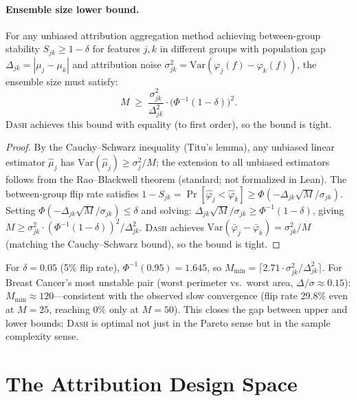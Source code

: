 \documentclass{jmlr}
\newcommand{\Var}{\mathrm{Var}}
\newcommand{\DASH}{\textsc{Dash}}
\begin{document}
\paragraph{Ensemble size lower bound.}
\begin{proposition}
\label{prop:ensemble-lower-bound}
For any unbiased attribution aggregation method achieving between-group stability $S_{jk} \geq 1 - \delta$ for features $j, k$ in different groups with population gap $\Delta_{jk} = |\mu_j - \mu_k|$ and attribution noise $\sigma_{jk}^2 = \Var(\varphi_j(f) - \varphi_k(f))$, the ensemble size must satisfy:
\[
    M \;\geq\; \frac{\sigma_{jk}^2}{\Delta_{jk}^2} \cdot \bigl(\Phi^{-1}(1-\delta)\bigr)^2.
\]
\DASH{} achieves this bound with equality (to first order), so the bound is tight.
\end{proposition}

\begin{proof}
By the Cauchy--Schwarz inequality (Titu's lemma), any unbiased linear estimator $\hat\mu_j$ has $\Var(\hat\mu_j) \geq \sigma_j^2/M$; the extension to all unbiased estimators follows from the Rao--Blackwell theorem (standard; not formalized in Lean). The between-group flip rate satisfies $1 - S_{jk} = \Pr[\hat\varphi_j < \hat\varphi_k] \geq \Phi(-\Delta_{jk}\sqrt{M}/\sigma_{jk})$. Setting $\Phi(-\Delta_{jk}\sqrt{M}/\sigma_{jk}) \leq \delta$ and solving: $\Delta_{jk}\sqrt{M}/\sigma_{jk} \geq \Phi^{-1}(1-\delta)$, giving $M \geq \sigma_{jk}^2 \cdot (\Phi^{-1}(1-\delta))^2/\Delta_{jk}^2$. \DASH{} achieves $\Var(\bar\varphi_j - \bar\varphi_k) = \sigma_{jk}^2/M$ (matching the Cauchy--Schwarz bound), so the bound is tight.
\end{proof}

For $\delta = 0.05$ (5\% flip rate), $\Phi^{-1}(0.95) = 1.645$, so $M_{\min} = \lceil 2.71 \cdot \sigma_{jk}^2/\Delta_{jk}^2 \rceil$. For Breast Cancer's most unstable pair (worst perimeter vs.\ worst area, $\Delta/\sigma \approx 0.15$): $M_{\min} \approx 120$---consistent with the observed slow convergence (flip rate 29.8\% even at $M = 25$, reaching 0\% only at $M = 50$). This closes the gap between upper and lower bounds: \DASH{} is optimal not just in the Pareto sense but in the sample complexity sense.


\section{The Attribution Design Space}
\label{sec:design-space}
\end{document}
